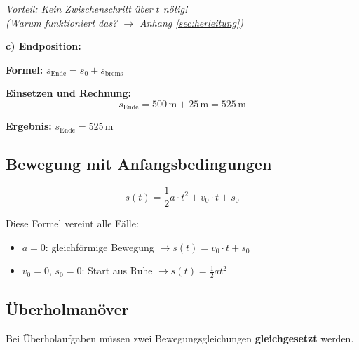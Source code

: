 \documentclass[11pt,a4paper]{article}
\begin{document}
\begin{beispiel}
\begin{tcolorbox}[colback=physikblue!5, colframe=physikblue, boxrule=0.5pt, title=\textbf{Variante B: Mit zeitloser Formel}]
\textit{Vorteil: Kein Zwischenschritt über $t$ nötig!}\\[0.3em]
\textit{(Warum funktioniert das? $\rightarrow$ Anhang \ref{sec:herleitung})}
\end{tcolorbox}

\vspace{0.3cm}
\textbf{c) Endposition:}

\textbf{Formel:} $s_{\text{Ende}} = s_0 + s_{\text{brems}}$

\textbf{Einsetzen und Rechnung:}
\[
s_{\text{Ende}} = 500\,\mathrm{m} + 25\,\mathrm{m} = 525\,\mathrm{m}
\]

\textbf{Ergebnis:} $\boxed{s_{\text{Ende}} = 525\,\mathrm{m}}$
\end{beispiel}

\subsection{Bewegung mit Anfangsbedingungen}

\begin{formelbox}
\[
\boxed{s(t) = \frac{1}{2} a \cdot t^2 + v_0 \cdot t + s_0}
\]

Diese Formel vereint alle Fälle:
\begin{itemize}
\item $a = 0$: gleichförmige Bewegung $\rightarrow s(t) = v_0 \cdot t + s_0$
\item $v_0 = 0$, $s_0 = 0$: Start aus Ruhe $\rightarrow s(t) = \frac{1}{2}at^2$
\end{itemize}
\end{formelbox}

\subsection{Überholmanöver}

Bei Überholaufgaben müssen zwei Bewegungsgleichungen \textbf{gleichgesetzt} werden.
\end{document}
